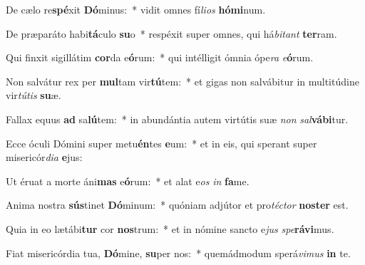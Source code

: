 \item De cælo re\textbf{spé}xit \textbf{Dó}minus:~* vidit omnes fí\textit{li}\textit{os} \textbf{hó}\textbf{mi}num.
\item De præparáto habi\textbf{tá}culo \textbf{su}o~* respéxit super omnes, qui há\textit{bi}\textit{tant} \textbf{ter}ram.
\item Qui finxit sigillátim \textbf{cor}da e\textbf{ó}rum:~* qui intélligit ómnia ópe\textit{ra} \textit{e}\textbf{ó}rum.
\item Non salvátur rex per \textbf{mul}tam vir\textbf{tú}tem:~* et gigas non salvábitur in multitúdine vir\textit{tú}\textit{tis} \textbf{su}æ.
\item Fallax equus \textbf{ad} sa\textbf{lú}tem:~* in abundántia autem virtútis suæ \textit{non} \textit{sal}\textbf{vá}\textbf{bi}tur.
\item Ecce óculi Dómini super metu\textbf{én}tes \textbf{e}um:~* et in eis, qui sperant super misericór\textit{di}\textit{a} \textbf{e}jus:
\item Ut éruat a morte áni\textbf{mas} e\textbf{ó}rum:~* et alat e\textit{os} \textit{in} \textbf{fa}me.
\item Anima nostra \textbf{sús}tinet \textbf{Dó}minum:~* quóniam adjútor et pro\textit{téc}\textit{tor} \textbf{nos}\textbf{ter} est.
\item Quia in eo lætábi\textbf{tur} cor \textbf{nos}trum:~* et in nómine sancto e\textit{jus} \textit{spe}\textbf{rá}\textbf{vi}mus.
\item Fiat misericórdia tua, \textbf{Dó}mine, \textbf{su}per nos:~* quemádmodum sperá\textit{vi}\textit{mus} \textbf{in} te.
